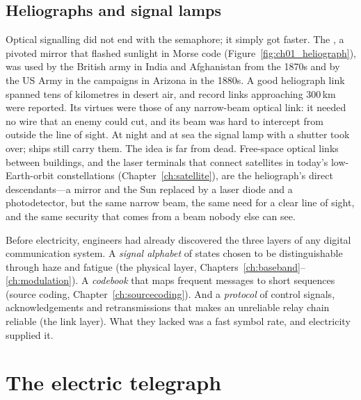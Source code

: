 \subsection{Heliographs and signal lamps}

Optical signalling did not end with the semaphore; it simply got faster. The , a
pivoted mirror that flashed sunlight in Morse code (Figure~\ref{fig:ch01_heliograph}), was used by
the British army in India and Afghanistan from the 1870s and by the US Army in the campaigns in
Arizona in the 1880s. A good heliograph link spanned tens of kilometres in desert air, and record
links approaching 300\,km were reported. Its virtues were those of any narrow-beam optical link: it
needed no wire that an enemy could cut, and its beam was hard to intercept from outside the line of
sight. At night and at sea the signal lamp with a shutter took over; ships still carry them. The
idea is far from dead. Free-space optical links between buildings, and the laser terminals that
connect satellites in today's low-Earth-orbit constellations (Chapter~\ref{ch:satellite}), are the
heliograph's direct descendants---a mirror and the Sun replaced by a laser diode and a
photodetector, but the same narrow beam, the same need for a clear line of sight, and the same
security that comes from a beam nobody else can see.

\begin{keyidea}
Before electricity, engineers had already discovered the three layers of any digital
communication system. A \emph{signal alphabet} of states chosen to be distinguishable through
haze and fatigue (the physical layer, Chapters~\ref{ch:baseband}--\ref{ch:modulation}). A
\emph{codebook} that maps frequent messages to short sequences (source coding,
Chapter~\ref{ch:sourcecoding}). And a \emph{protocol} of control signals, acknowledgements and
retransmissions that makes an unreliable relay chain reliable (the link layer). What they lacked
was a fast symbol rate, and electricity supplied it.
\end{keyidea}

\section{The electric telegraph}
\label{sec:ch01:telegraph}

